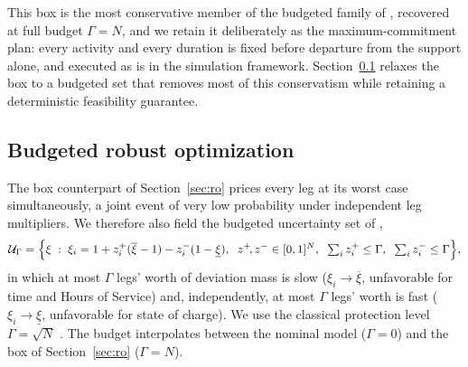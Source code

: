 \documentclass[preprint,12pt,3p]{elsarticle}
\begin{document}
This box is the most conservative member of the budgeted family of \citet{bertsimas_price_2004}, recovered at full budget $\Gamma = N$, and we retain it deliberately as the maximum-commitment plan: every activity and every duration is fixed before departure from the support alone, and executed as is in the simulation framework. Section~\ref{sec:robu} relaxes the box to a budgeted set that removes most of this conservatism while retaining a deterministic feasibility guarantee.


\subsection{Budgeted robust optimization} \label{sec:robu}
The box counterpart of Section~\ref{sec:ro} prices every leg at its worst case simultaneously, a joint event of very low probability under independent leg multipliers. We therefore also field the budgeted uncertainty set of \citet{bertsimas_price_2004},
\[
  \mathcal U_\Gamma = \Bigl\{ \xi \;:\; \xi_i = 1 + z_i^{+}(\overline\xi - 1) - z_i^{-}(1-\underline\xi),
  \;\; z^{+}\!, z^{-} \in [0,1]^N,
  \;\; \textstyle\sum_i z_i^{+} \le \Gamma,
  \;\; \sum_i z_i^{-} \le \Gamma \Bigr\},
\]
in which at most $\Gamma$ legs' worth of deviation mass is slow ($\xi_i \to \overline\xi$, unfavorable for time and Hours of Service) and, independently, at most $\Gamma$ legs' worth is fast ($\xi_i \to \underline\xi$, unfavorable for state of charge).
We use the classical protection level $\Gamma = \sqrt{N} $ \citep{bertsimas_price_2004}. The budget interpolates between the nominal model ($\Gamma = 0$) and the box of Section~\ref{sec:ro} ($\Gamma = N$).
\end{document}
